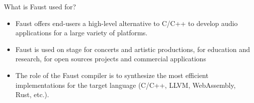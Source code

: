 
\begin{frame}[fragile]{What is Faust used for?}
	\begin{itemize}
		
		\item Faust offers end-users a high-level alternative to C/C++ to develop audio applications for a large variety of platforms.
		\item Faust is used on stage for concerts and artistic productions, for education and research, for open sources projects and commercial applications
		\item The role of the Faust compiler is to synthesize the most efficient implementations for the target language (C/C++, LLVM, WebAssembly, Rust, etc.).
	\end{itemize}
	
\end{frame}
